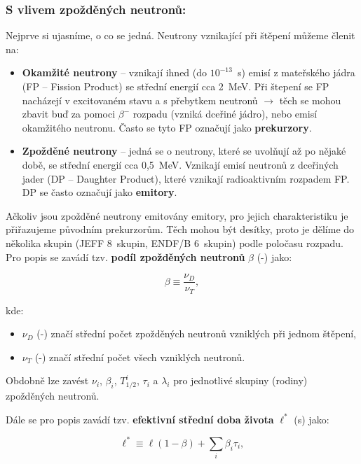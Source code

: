 \subsubsection{S vlivem zpožděných neutronů:}

Nejprve si ujasníme, o co se jedná. Neutrony vznikající při štěpení můžeme členit na:

\begin{itemize}
  \item \textbf{Okamžité neutrony} -- vznikají ihned (do $10^{-13}$~s) emisí z mateřského jádra (FP -- Fission Product) se střední energií cca 2~MeV. Při štepení se FP nacházejí v excitovaném stavu a s přebytkem neutronů $\rightarrow$ těch se mohou zbavit buď za pomoci $\beta^-$ rozpadu (vzniká dceřiné jádro), nebo emisí okamžitého neutronu. Často se tyto FP označují jako \textbf{prekurzory}.
  \item \textbf{Zpožděné neutrony} -- jedná se o neutrony, které se uvolňují až po nějaké době, se střední energií cca 0,5~MeV. Vznikají emisí neutronů z dceřiných jader (DP -- Daughter Product), které vznikají radioaktivním rozpadem FP. DP se často označují jako \textbf{emitory}.
\end{itemize}

Ačkoliv jsou zpožděné neutrony emitovány emitory, pro jejich charakteristiku je přiřazujeme původním prekurzorům. Těch mohou být desítky, proto je dělíme do několika skupin (JEFF 8~skupin, ENDF/B 6~skupin) podle poločasu rozpadu. Pro popis se zavádí tzv. \textbf{podíl zpožděných neutronů} $\beta$ (-) jako:

\begin{equation}
  \boxed{
  \beta \equiv \dfrac{\nu_D}{\nu_T},
  \label{zpozdenky}}
\end{equation}

kde:

\begin{itemize}
  \item $\nu_D$ (-) značí střední počet zpožděných neutronů vzniklých při jednom štěpení,
  \item $\nu_T$ (-) značí střední počet všech vzniklých neutronů.
\end{itemize}

Obdobně lze zavést $\nu_i$, $\beta_i$, $T_{1/2}^i$, $\tau_i$ a $\lambda_i$ pro jednotlivé skupiny (rodiny) zpožděných neutronů.

Dále se pro popis zavádí tzv. \textbf{efektivní střední doba života} $\ell^*$ (s) jako:

\begin{equation}
  \boxed{
  \ell^* \equiv \ell(1-\beta) + \sum_i \beta_i \tau_i,
  \label{efektivni_stredni_doba_zivota}}
\end{equation}

